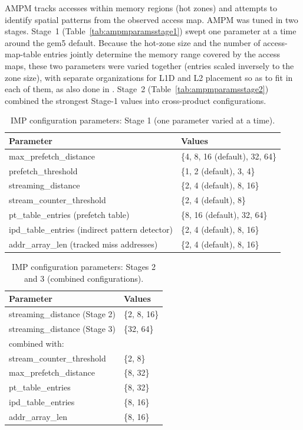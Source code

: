 \documentclass[12pt, letterpaper]{article}
\begin{document}
\noindent AMPM tracks accesses within memory regions (hot zones) and attempts to identify spatial patterns from the observed access map. AMPM was tuned in two stages. Stage~1 (Table~\ref{tab:ampmparamsstage1}) swept one parameter at a time around the gem5 default. Because the hot-zone size and the number of access-map-table entries jointly determine the memory range covered by the access maps, these two parameters were varied together (entries scaled inversely to the zone size), with separate organizations for L1D and L2 placement so as to fit in each of them, as also done in \cite{ishii-jilp-11}. Stage~2 (Table~\ref{tab:ampmparamsstage2}) combined the strongest Stage-1 values into cross-product configurations.

\begin{table}[h]
\caption{IMP configuration parameters: Stage 1 (one parameter varied at a time).}
\centering
\begin{tabular}{l|l}
\hline
\textbf{Parameter} & \textbf{Values} \\ \hline
max\_prefetch\_distance & \{4, 8, 16 (default), 32, 64\} \\
prefetch\_threshold & \{1, 2 (default), 3, 4\} \\
streaming\_distance & \{2, 4 (default), 8, 16\} \\
stream\_counter\_threshold & \{2, 4 (default), 8\} \\
pt\_table\_entries (prefetch table) & \{8, 16 (default), 32, 64\} \\
ipd\_table\_entries (indirect pattern detector) & \{2, 4 (default), 8, 16\} \\
addr\_array\_len (tracked miss addresses) & \{2, 4 (default), 8, 16\} \\ \hline
\end{tabular}
\label{tab:impparamsstage1}
\end{table}

\begin{table}[h]
\caption{IMP configuration parameters: Stages 2 and 3 (combined configurations).}
\centering
\begin{tabular}{l|l}
\hline
\textbf{Parameter} & \textbf{Values} \\ \hline
streaming\_distance (Stage 2) & \{2, 8, 16\} \\
streaming\_distance (Stage 3) & \{32, 64\} \\
\quad combined with: & \\
stream\_counter\_threshold & \{2, 8\} \\
max\_prefetch\_distance & \{8, 32\} \\
pt\_table\_entries & \{8, 32\} \\
ipd\_table\_entries & \{8, 16\} \\
addr\_array\_len & \{8, 16\} \\ \hline
\end{tabular}
\label{tab:impparamsstage2and3}
\end{table}
\end{document}
